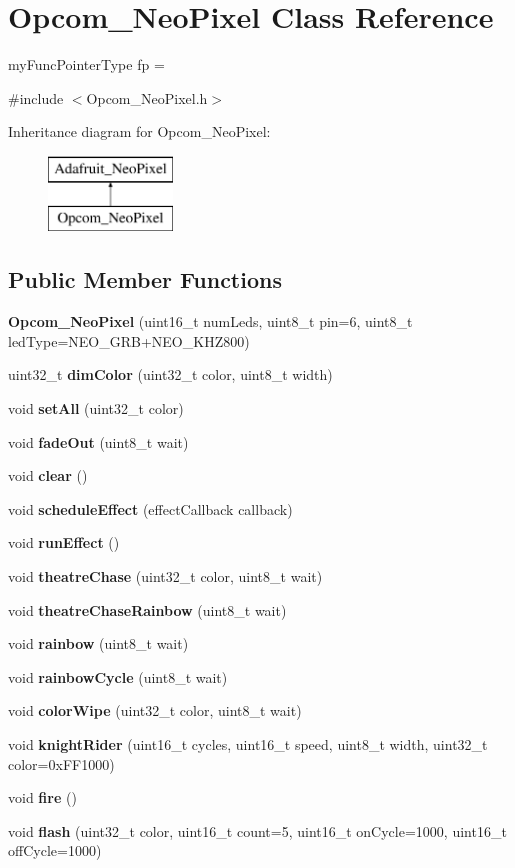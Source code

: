 \section{Opcom\+\_\+\+Neo\+Pixel Class Reference}
\label{class_opcom___neo_pixel}


my\+Func\+Pointer\+Type fp =   




{\ttfamily \#include $<$Opcom\+\_\+\+Neo\+Pixel.\+h$>$}

Inheritance diagram for Opcom\+\_\+\+Neo\+Pixel\+:\begin{figure}[H]
\begin{center}
\leavevmode
\includegraphics[height=2.000000cm]{class_opcom___neo_pixel}
\end{center}
\end{figure}
\subsection*{Public Member Functions}
\begin{DoxyCompactItemize}
\item 
{\bfseries Opcom\+\_\+\+Neo\+Pixel} (uint16\+\_\+t num\+Leds, uint8\+\_\+t pin=6, uint8\+\_\+t led\+Type=N\+E\+O\+\_\+\+G\+R\+B+N\+E\+O\+\_\+\+K\+H\+Z800)\label{class_opcom___neo_pixel_a9e36e1f3118dce6e684c6d571ed3f5cb}

\item 
uint32\+\_\+t {\bfseries dim\+Color} (uint32\+\_\+t color, uint8\+\_\+t width)\label{class_opcom___neo_pixel_a95f247f1fe109423ff896120d3fa989e}

\item 
void {\bf set\+All} (uint32\+\_\+t color)
\item 
void {\bf fade\+Out} (uint8\+\_\+t wait)
\item 
void {\bf clear} ()
\item 
void {\bf schedule\+Effect} (effect\+Callback callback)
\item 
void {\bf run\+Effect} ()
\item 
void {\bf theatre\+Chase} (uint32\+\_\+t color, uint8\+\_\+t wait)
\item 
void {\bf theatre\+Chase\+Rainbow} (uint8\+\_\+t wait)
\item 
void {\bf rainbow} (uint8\+\_\+t wait)
\item 
void {\bf rainbow\+Cycle} (uint8\+\_\+t wait)
\item 
void {\bf color\+Wipe} (uint32\+\_\+t color, uint8\+\_\+t wait)
\item 
void {\bf knight\+Rider} (uint16\+\_\+t cycles, uint16\+\_\+t speed, uint8\+\_\+t width, uint32\+\_\+t color=0x\+F\+F1000)
\item 
void {\bf fire} ()
\item 
void {\bf flash} (uint32\+\_\+t color, uint16\+\_\+t count=5, uint16\+\_\+t on\+Cycle=1000, uint16\+\_\+t off\+Cycle=1000)
\end{DoxyCompactItemize}
